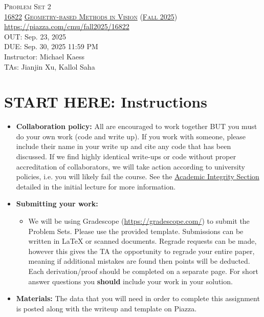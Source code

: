 \documentclass[11pt,addpoints,answers]{exam}
\title{\textsc{\hwName}} %
\author{}
\date{}
\date{}
\numberwithin{equation}{section} %
\numberwithin{figure}{section} %
\numberwithin{table}{section} %
\newcommand{\courseNum}{\href{https://geometric3d.github.io}{16822}}
\newcommand{\courseName}{\href{https://geometric3d.github.io}{Geometry-based Methods in Vision}}
\newcommand{\courseSem}{\href{https://geometric3d.github.io}{Fall 2025}}
\newcommand{\courseUrl}{\url{https://piazza.com/cmu/fall2025/16822}}
\newcommand{\hwNum}{Problem Set 2}
\newcommand{\hwTopic}{Single View Geometry and Reconstruction}
\newcommand{\outDate}{Sep. 23, 2025}
\newcommand{\dueDate}{Sep. 30, 2025 11:59 PM}
\newcommand{\instructorName}{Michael Kaess}
\newcommand{\taNames}{Jianjin Xu, Kallol Saha}
\begin{document}
\section*{}
\begin{center}
  \textsc{\LARGE \hwNum} \\
  \vspace{1em}
  \textsc{\large \courseNum{} \courseName{} (\courseSem)} \\
  \courseUrl\\
  \vspace{1em}
  OUT: \outDate \\
  DUE: \dueDate \\
  Instructor: \instructorName \\
  TAs: \taNames
\end{center}


\section*{START HERE: Instructions}
\begin{itemize}
\item \textbf{Collaboration policy:} All are encouraged to work together BUT you must do your own work (code and write up). If you work with someone, please include their name in your write up and cite any code that has been discussed. If we find highly identical write-ups or code without proper accreditation of collaborators, we will take action according to university policies, i.e. you will likely fail the course. See the \href{https://www.dropbox.com/s/z6o0tinc9eaez46/L01_Overview.pdf?dl=0}{Academic Integrity Section} detailed in the initial lecture for more information.


\item\textbf{Submitting your work:}

\begin{itemize}

\item We will be using Gradescope (\url{https://gradescope.com/}) to submit the Problem Sets. Please use the provided template. Submissions can be written in LaTeX or scanned documents. Regrade requests can be made, however this gives the TA the opportunity to regrade your entire paper, meaning if additional mistakes are found then points will be deducted.
Each derivation/proof should be  completed on a separate page. For short answer questions you \textbf{should} include your work in your solution.  
\end{itemize}

\item \textbf{Materials:} The data that you will need in order to complete this assignment is posted along with the writeup and template on Piazza.

\end{itemize}
\end{document}
